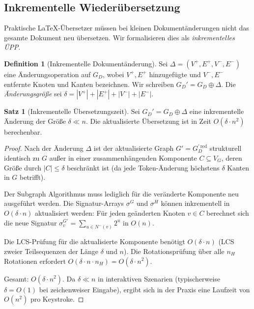 ﻿\documentclass[a4paper,12pt]{article}
\theoremstyle{definition}
\newtheorem{definition}{Definition}
\newtheorem{satz}{Satz}
\begin{document}
\subsection{Inkrementelle Wiederübersetzung}
\label{sec:ltx-inkrementell}

Praktische \LaTeX-Übersetzer müssen bei kleinen Dokumentänderungen nicht
das gesamte Dokument neu übersetzen. Wir formalisieren dies als
\emph{inkrementelles ÜPP}.

\begin{definition}[Inkrementelle Dokumentänderung]
	\label{def:ltx-delta}
	Sei $\Delta = (V^+, E^+, V^-, E^-)$ eine Änderungsoperation auf $G_D$,
	wobei $V^+, E^+$ hinzugefügte und $V^-, E^-$ entfernte Knoten und Kanten
	bezeichnen. Wir schreiben $G_D' = G_D \oplus \Delta$. Die \emph{Änderungsgröße}
	sei $\delta = |V^+| + |E^+| + |V^-| + |E^-|$.
\end{definition}

\begin{satz}[Inkrementelle Übersetzungszeit]
	\label{satz:ltx-inkrementell}
	Sei $G_D' = G_D \oplus \Delta$ eine inkrementelle Änderung der Größe
	$\delta \ll n$. Die aktualisierte Übersetzung ist in Zeit
	$O(\delta \cdot n^2)$ berechenbar.
\end{satz}

\begin{proof}
	Nach der Änderung $\Delta$ ist der aktualisierte Graph $G' = G_D^{\prime\,\mathrm{red}}$
	strukturell identisch zu $G$ außer in einer zusammenhängenden Komponente
	$C \subseteq V_G$, deren Größe durch $|C| \le \delta$ beschränkt ist
	(da jede Token-Änderung höchstens $\delta$ Kanten in $G$ betrifft).
	
	Der Subgraph Algorithmus muss lediglich für die veränderte Komponente
	neu ausgeführt werden. Die Signatur-Arrays $\sigma^G$ und $\sigma^H$
	können inkrementell in $O(\delta \cdot n)$ aktualisiert werden:
	Für jeden geänderten Knoten $v \in C$ berechnet sich die neue Signatur
	$\sigma_v^{G'} = \sum_{u \in N^-(v)} 2^u$ in $O(n)$.
	
	Die LCS-Prüfung für die aktualisierte Komponente benötigt
	$O(\delta \cdot n)$ (LCS zweier Teilsequenzen der Länge $\delta$ und $n$).
	Die Rotationsprüfung über alle $n_H$ Rotationen erfordert
	$O(\delta \cdot n \cdot n_H) = O(\delta \cdot n^2)$.
	
	Gesamt: $O(\delta \cdot n^2)$. Da $\delta \ll n$ in interaktiven
	Szenarien (typischerweise $\delta = O(1)$ bei zeichenweiser Eingabe),
	ergibt sich in der Praxis eine Laufzeit von $O(n^2)$ pro Keystroke. 
\end{proof}
\end{document}
